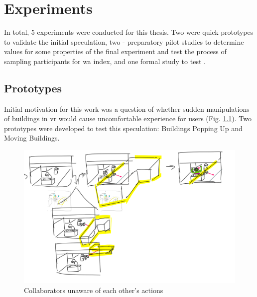 
\chapter{Experiments}

In total, 5 experiments were conducted for this thesis. Two were quick prototypes to validate the initial speculation, two - preparatory pilot studies to determine values for some properties of the final experiment and test the process of sampling participants for \gls{wa} index, and one formal study to test .

\section{Prototypes}
Initial motivation for this work was a question of whether sudden manipulations of buildings in \gls{vr} would cause uncomfortable experience for users (Fig. \ref{fig:a1unawareofa2actions}). Two prototypes were developed to test this speculation: Buildings Popping Up and Moving Buildings.

\begin{figure}
	\centering
	\includegraphics[width=0.7\linewidth]{figures/placeholders/A1_unaware_of_A2_actions}
	\caption{Collaborators unaware of each other's actions}
	\label{fig:a1unawareofa2actions}
\end{figure}

